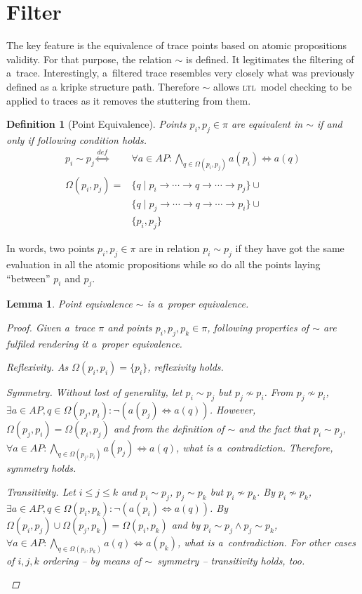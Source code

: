 \documentclass[12pt,oneside,draft]{fithesis}
\newcommand{\ltl}{\textsc{ltl}~}
\newtheorem{mydef}{Definition}
\newtheorem{mylemma}{Lemma}
\begin{document}
\section{Filter}
The key feature is the equivalence of trace points based on atomic
propositions validity. For that purpose, the relation $\sim$ is defined.
It legitimates the filtering of a~trace. Interestingly,
a~filtered trace resembles very closely what was previously defined as
a kripke structure path. Therefore $\sim$ allows \ltl model checking
to be applied to traces as it removes the stuttering from
them\cite{lamport}.
\begin{mydef}[Point Equivalence]
Points $p_i,p_j\in\pi$ are equivalent in $\sim$ if and only if following
condition holds.
\begin{align}
	p_i\sim p_j	\overset{def}{\iff}&\forall a\in AP:
		\bigwedge_{q\in\Omega(p_i,p_j)}a(p_i)\iff a(q)\\
\Omega(p_i,p_j)=&\{q\mid p_i\rightarrow\dotsm\rightarrow q
		\rightarrow\dotsm\rightarrow p_j\}\cup\nonumber\\
		&\{q\mid p_j\rightarrow\dotsm\rightarrow q\rightarrow\dotsm
		\rightarrow p_i\}\cup\nonumber\\
		&\{p_i,p_j\}
\end{align}
\end{mydef}
In words, two points $p_i,p_j\in\pi$ are in relation $p_i\sim p_j$ if
they have got the same evaluation in all the atomic propositions while
so do all the points laying ``between'' $p_i$ and $p_j$.
\begin{mylemma}
Point equivalence $\sim$ is a~proper equivalence.
\begin{proof}Given a~trace $\pi$ and points $p_i,p_j,p_k\in\pi$,
following properties of $\sim$ are fulfiled rendering it a~proper
equivalence.
	\begin{inparaenum}
		\item{Reflexivity.} As $\Omega(p_i,p_i)=\{p_i\}$,
			reflexivity holds.
		\item{Symmetry.} Without lost of generality, let $p_i\sim p_j$
			but $p_j\not\sim p_i$. From $p_j\not\sim p_i$,
			$\exists a\in AP,q\in\Omega(p_j, p_i):\neg(a(p_j)
			\iff a(q))$. However, $\Omega(p_j, p_i)=\Omega(p_i,p_j)$
			and from the definition of $\sim$ and the fact that
			$p_i\sim p_j$,
			$\forall a\in AP:\bigwedge_{q\in\Omega(p_j,p_i)}a(p_j)\iff
			a(q)$, what is a~contradiction. Therefore, symmetry holds.
		\item{Transitivity.} Let $i\leq j\leq k$ and $p_i\sim p_j$,
			$p_j\sim p_k$ but $p_i\not\sim p_k$. By $p_i\not\sim p_k$,
			$\exists a\in AP, q\in\Omega(p_i, p_k):
			\neg(a(p_i)\iff a(q))$. By
			$\Omega(p_i,p_j)\cup\Omega(p_j,p_k)=\Omega(p_i,p_k)$ and by
			$p_i\sim p_j\wedge p_j\sim p_k$,
			$\forall a\in AP:\bigwedge_{q\in\Omega(p_i,p_k)}a(q)
			\iff a(p_k)$, what is a~contradiction. For other cases of
			$i,j,k$ ordering -- by means of $\sim$~symmetry --
			transitivity holds, too.
	\end{inparaenum}
	\qedhere
\end{proof}
\end{mylemma}
\end{document}
